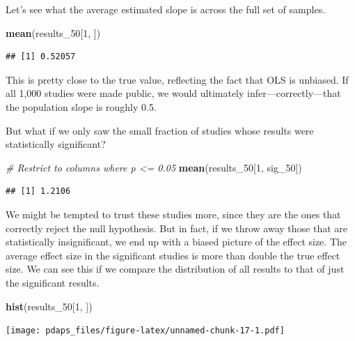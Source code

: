 \documentclass[12pt,oneside,openany]{book}
\newenvironment{Shaded}{\begin{snugshade}}{\end{snugshade}}
\newcommand{\KeywordTok}[1]{\textcolor[rgb]{0.13,0.29,0.53}{\textbf{#1}}}
\newcommand{\DecValTok}[1]{\textcolor[rgb]{0.00,0.00,0.81}{#1}}
\newcommand{\CommentTok}[1]{\textcolor[rgb]{0.56,0.35,0.01}{\textit{#1}}}
\newcommand{\NormalTok}[1]{#1}
\begin{document}
Let's see what the average estimated slope is across the full set of
samples.

\begin{Shaded}
\begin{Highlighting}[]
\KeywordTok{mean}\NormalTok{(results_}\DecValTok{50}\NormalTok{[}\DecValTok{1}\NormalTok{, ])}
\end{Highlighting}
\end{Shaded}

\begin{verbatim}
## [1] 0.52057
\end{verbatim}

This is pretty close to the true value, reflecting the fact that OLS is
unbiased. If all 1,000 studies were made public, we would ultimately
infer---correctly---that the population slope is roughly 0.5.

But what if we only saw the small fraction of studies whose results were
statistically significant?

\begin{Shaded}
\begin{Highlighting}[]
\CommentTok{# Restrict to columns where p <= 0.05}
\KeywordTok{mean}\NormalTok{(results_}\DecValTok{50}\NormalTok{[}\DecValTok{1}\NormalTok{, sig_}\DecValTok{50}\NormalTok{])}
\end{Highlighting}
\end{Shaded}

\begin{verbatim}
## [1] 1.2106
\end{verbatim}

We might be tempted to trust these studies more, since they are the ones
that correctly reject the null hypothesis. But in fact, if we throw away
those that are statistically insignificant, we end up with a biased
picture of the effect size. The average effect size in the significant
studies is more than double the true effect size. We can see this if we
compare the distribution of all results to that of just the significant
results.

\begin{Shaded}
\begin{Highlighting}[]
\KeywordTok{hist}\NormalTok{(results_}\DecValTok{50}\NormalTok{[}\DecValTok{1}\NormalTok{, ])}
\end{Highlighting}
\end{Shaded}

\texttt{[image: pdaps\_files/figure-latex/unnamed-chunk-17-1.pdf]}
\end{document}
